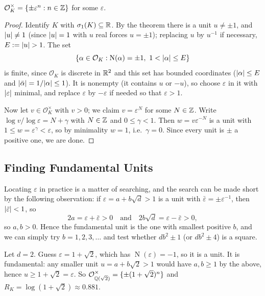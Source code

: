 \documentclass[a4paper]{scrartcl}
\renewcommand{\OO}{\mathcal{O}}
\newcommand{\Nm}{\operatorname{N}}
\begin{document}
\begin{corollary}
	$\OO_K^\times = \{\pm\varepsilon^n : n \in \Z\}$ for some $\varepsilon$.
\end{corollary}

\begin{proof}
	Identify $K$ with $\sigma_1(K)\subseteq\mathbb{R}$. By the theorem there is a unit $u \neq \pm1$, and $\lvert u\rvert \neq 1$ (since $\lvert u\rvert = 1$ with $u$ real forces $u = \pm1$); replacing $u$ by $u^{-1}$ if necessary, $E := \lvert u\rvert > 1$. The set
	$$\left\{\alpha \in \OO_K : \Nm(\alpha) = \pm1,\ 1 < \abs{\alpha}\le E\right\}$$
	is finite, since $\OO_K$ is discrete in $\mathbb{R}^2$ and this set has bounded coordinates ($\lvert\alpha\rvert \le E$ and $\lvert\bar\alpha\rvert = 1/\lvert\alpha\rvert \le 1$). It is nonempty (it contains $u$ or $-u$), so choose $\varepsilon$ in it with $\lvert\varepsilon\rvert$ minimal, and replace $\varepsilon$ by $-\varepsilon$ if needed so that $\varepsilon > 1$.

	Now let $v \in \OO_K^\times$ with $v > 0$; we claim $v = \varepsilon^N$ for some $N \in \mathbb{Z}$. Write $\log v/\log\varepsilon = N + \gamma$ with $N \in \mathbb{Z}$ and $0 \le \gamma < 1$. Then $w = v\varepsilon^{-N}$ is a unit with $1 \le w = \varepsilon^{\gamma} < \varepsilon$, so by minimality $w = 1$, i.e.\ $\gamma = 0$. Since every unit is $\pm$ a positive one, we are done.
\end{proof}

\subsection{Finding Fundamental Units}

Locating $\varepsilon$ in practice is a matter of searching, and the search can be made short by the following observation: if $\varepsilon = a+b\sqrt d > 1$ is a unit with $\bar\varepsilon = \pm\varepsilon^{-1}$, then $\lvert\bar\varepsilon\rvert<1$, so
$$2a = \varepsilon+\bar\varepsilon > 0 \quad\text{and}\quad 2b\sqrt d = \varepsilon - \bar\varepsilon > 0,$$
so $a, b > 0$. Hence the fundamental unit is the one with smallest positive $b$, and we can simply try $b = 1, 2, 3, \dots$ and test whether $db^2\pm1$ (or $db^2\pm4$) is a square.

\begin{example}
	Let $d = 2$. Guess $\varepsilon = 1+\sqrt2$, which has $\Nm(\varepsilon) = -1$, so it is a unit. It is fundamental: any smaller unit $u = a+b\sqrt2 > 1$ would have $a, b \geq 1$ by the above, hence $u \geq 1+\sqrt2 = \varepsilon$. So $\OO_{\Q(\sqrt2)}^\times = \{\pm(1+\sqrt2)^n\}$ and $R_K = \log(1+\sqrt2) \approx 0.881$.
\end{example}
\end{document}
